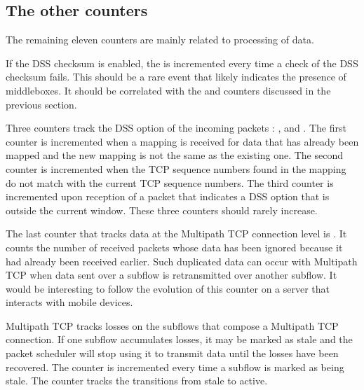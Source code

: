 \documentclass[letterpaper,10pt,english]{sphinxmanual}
\begin{document}
\subsection{The other counters}
\label{\detokenize{mptcp-linux:the-other-counters}}
\sphinxAtStartPar
The remaining eleven counters are mainly related to processing of data.

\sphinxAtStartPar
If the DSS checksum is enabled, the  is incremented
every time a check of the DSS checksum fails. This should be a rare event that
likely indicates the presence of middleboxes. It should be correlated with
the  and  counters discussed in the
previous section.

\sphinxAtStartPar
Three counters track the DSS option of the incoming packets :
,  and
. The first counter is
incremented when a mapping is received for data that has already been mapped
and the new mapping is not the same as the existing one. The second counter
is incremented when the TCP sequence numbers found in the mapping do not
match with the current TCP sequence numbers. The third counter is incremented
upon reception of a packet that indicates a DSS option that is outside the
current window. These three counters should rarely increase.

\sphinxAtStartPar
The last counter that tracks data at the Multipath TCP connection
level is . It counts the number of received
packets whose data has been ignored because it had already been received
earlier. Such duplicated data can occur with Multipath TCP when data
sent over a subflow is retransmitted over another subflow. It would
be interesting to follow the evolution of this counter on a server that
interacts with mobile devices.

\sphinxAtStartPar
Multipath TCP tracks losses on the subflows that compose a Multipath
TCP connection. If one subflow accumulates losses, it may be marked
as stale and the packet scheduler will stop using it to transmit data
until the losses have been recovered. The  counter is
incremented every time a subflow is marked as being stale. The
 counter tracks the transitions from stale to
active.
\end{document}
